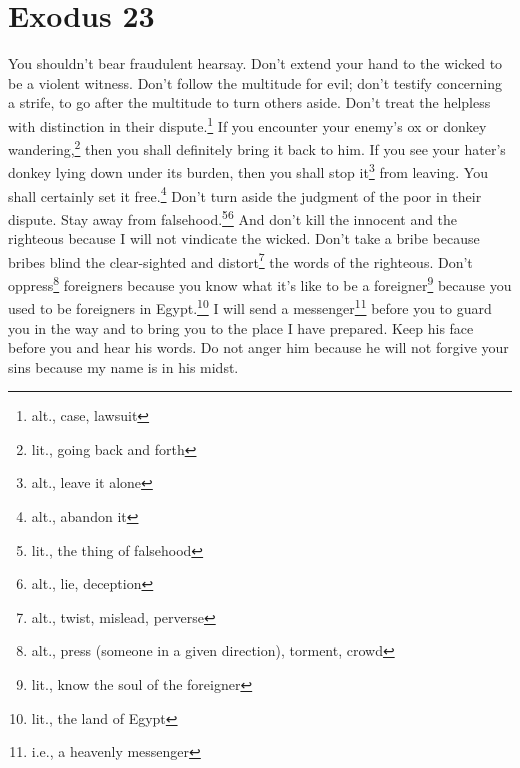 \section{Exodus 23}\label{Exodus 23}
\begin{enumerate}[align=center]
     You shouldn't bear fraudulent hearsay. Don't extend your hand to the wicked to be a violent witness.%
     Don't follow the multitude for evil; don't testify concerning a strife, to go after the multitude to turn others aside.%
     Don't treat the helpless with distinction in their dispute.\footnote{alt., case, lawsuit}%
     If you encounter your enemy's ox or donkey wandering,\footnote{lit., going back and forth} then you shall definitely bring it back to him.%
     If you see your hater's donkey lying down under its burden, then you shall stop it\footnote{alt., leave it alone} from leaving. You shall certainly set it free.\footnote{alt., abandon it}%
     Don't turn aside the judgment of the poor in their dispute.%
     Stay away from falsehood.\footnote{lit., the thing of falsehood}\footnote{alt., lie, deception} And don't kill the innocent and the righteous because I will not vindicate the wicked.%
     Don't take a bribe because bribes blind the clear-sighted and distort\footnote{alt., twist, mislead, perverse} the words of the righteous.%
     Don't oppress\footnote{alt., press (someone in a given direction), torment, crowd} foreigners because you know what it's like to be a foreigner\footnote{lit., know the soul of the foreigner} because you used to be foreigners in Egypt.\footnote{lit., the land of Egypt}%
     I will send a messenger\footnote{i.e., a heavenly messenger} before you to guard you in the way and to bring you to the place I have prepared.%
     Keep his face before you and hear his words. Do not anger him because he will not forgive your sins because my name is in his midst.%

\end{enumerate}
